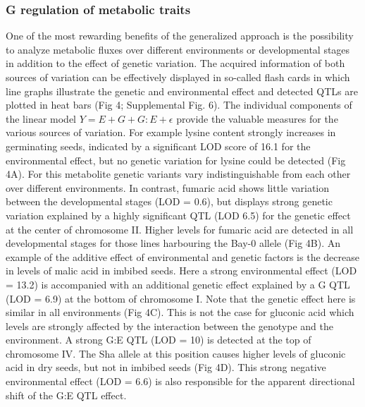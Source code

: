 \subsubsection{G regulation of metabolic traits}
One of the most rewarding benefits of the generalized approach is the possibility to analyze metabolic 
fluxes over different environments or developmental stages in addition to the effect of genetic variation. 
The acquired information of both sources of variation can be effectively displayed in so-called flash cards 
in which line graphs illustrate the genetic and environmental effect and detected QTLs are plotted in heat 
bars (Fig 4; Supplemental Fig. 6). The individual components of the linear model $Y = E + G + G:E + \epsilon$ 
provide the valuable measures for the various sources of variation. For example lysine content strongly 
increases in germinating seeds, indicated by a significant LOD score of 16.1 for the environmental effect, 
but no genetic variation for lysine could be detected (Fig 4A). For this metabolite genetic variants vary 
indistinguishable from each other over different environments. In contrast, fumaric acid shows little variation 
between the developmental stages (LOD = 0.6), but displays strong genetic variation explained by a highly 
significant QTL (LOD 6.5) for the genetic effect at the center of chromosome II. Higher levels for fumaric
 acid are detected in all developmental stages for those lines harbouring the Bay-0 allele (Fig 4B). An 
example of the additive effect of environmental and genetic factors is the decrease in levels of malic acid 
in imbibed seeds. Here a strong environmental effect (LOD = 13.2) is accompanied with an additional genetic 
effect explained by a G QTL (LOD = 6.9) at the bottom of chromosome I. Note that the genetic effect here is 
similar in all environments (Fig 4C). This is not the case for gluconic acid which levels are strongly 
affected by the interaction between the genotype and the environment. A strong G:E QTL (LOD = 10) is detected 
at the top of chromosome IV. The Sha allele at this position causes higher levels of gluconic acid in dry 
seeds, but not in imbibed seeds (Fig 4D). This strong negative environmental effect (LOD = 6.6) is also 
responsible for the apparent directional shift of the G:E QTL effect.

